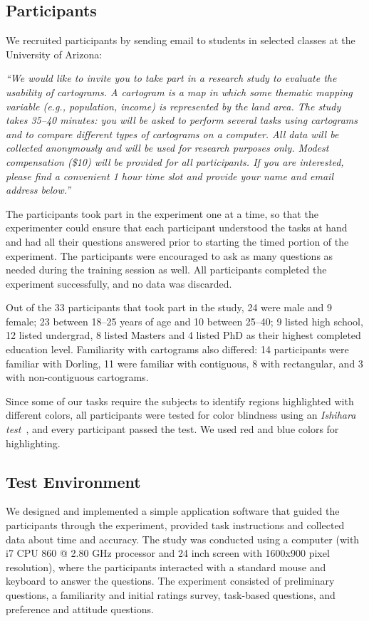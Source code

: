 \documentclass[10pt,journal,compsoc]{IEEEtran}
\begin{document}
\subsection{Participants}
 We recruited participants by sending email to students in selected classes at the University of Arizona: 
 
{\it ``We would like to invite you to take part in a research study to evaluate the usability of cartograms. A cartogram is a map in which some thematic mapping variable (e.g., population, income) is represented by the land area. The study takes 35--40 minutes: you will be asked to perform several tasks using cartograms and to compare different types of cartograms on a computer. All data will be collected anonymously and will be used for research purposes only. Modest compensation (\$10) will be provided for all participants. 
If you are interested, please find a convenient 1 hour time slot and provide your name and email address below.''}

The participants took part in the experiment one at a time, so that the experimenter could ensure that each participant understood the tasks at hand and had all their questions answered prior to starting the timed portion of the experiment. The participants were encouraged to ask as many questions as needed during the training session as well. 
All participants completed the experiment successfully, and no data was discarded.

Out of the 33 participants that took part in the study, 24 were male and 9 female; 23 between 18--25 years of age and 10 between 25--40; 9 listed high school, 12 listed undergrad, 8 listed Masters and
 4 listed PhD as their highest completed education level.
Familiarity with cartograms also differed:
14 participants were familiar with Dorling, 11 were familiar with contiguous, 8 with rectangular,  and
 3 with non-contiguous cartograms.

 Since some of our tasks require the subjects to identify
 regions highlighted with different colors, all participants were tested for color blindness using an \textit{Ishihara test}~\cite{Ishihara17}, and every participant passed the test. We used red and blue colors for highlighting.





\subsection {Test Environment}
We designed and implemented a simple application software that guided the participants through the experiment, provided task instructions and collected data about time and accuracy. 
The study was conducted using a computer (with i7 CPU 860 @ 2.80 GHz processor and 24 inch screen with 1600x900 pixel resolution), where the participants interacted with a standard mouse and keyboard to answer the questions. 
The experiment consisted of preliminary questions, a familiarity and initial ratings survey,  task-based questions, and preference and attitude questions.
\end{document}
